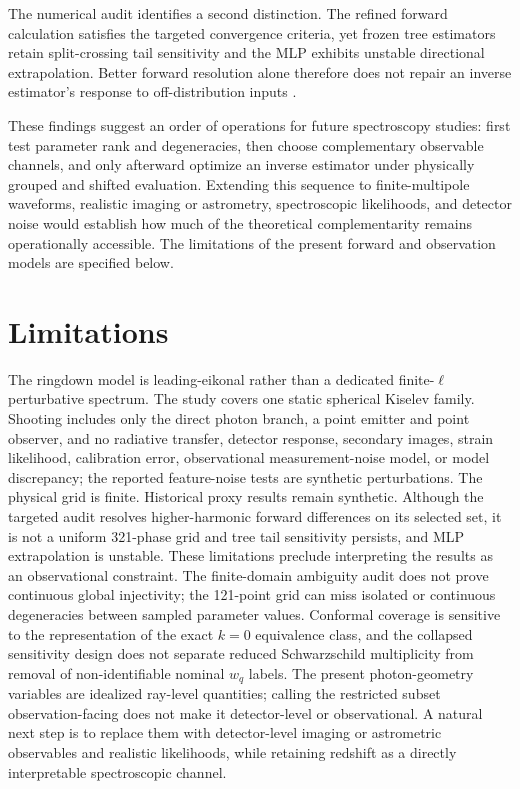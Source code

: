 \documentclass[11pt]{article}
\newcommand{\wq}{w_q}
\begin{document}
The numerical audit identifies a second distinction. The refined forward
calculation satisfies the targeted convergence criteria, yet frozen tree
estimators retain split-crossing tail sensitivity and the MLP exhibits
unstable directional extrapolation. Better forward resolution alone therefore
does not repair an inverse estimator's response to off-distribution inputs
\cite{ovadia2019uncertainty,koh2021wilds,psaros2023uq}.

These findings suggest an order of operations for future spectroscopy
studies: first test parameter rank and degeneracies, then choose complementary
observable channels, and only afterward optimize an inverse estimator under
physically grouped and shifted evaluation. Extending this sequence to
finite-multipole waveforms, realistic imaging or astrometry, spectroscopic
likelihoods, and detector noise would establish how much of the theoretical
complementarity remains operationally accessible. The limitations of the
present forward and observation models are specified below.

\section{Limitations}
The ringdown model is leading-eikonal rather than a dedicated finite-$\ell$
perturbative spectrum. The study covers one static spherical Kiselev family. Shooting includes only the
direct photon branch, a point emitter and point observer, and no radiative
transfer, detector response, secondary images, strain likelihood, calibration
error, observational measurement-noise model, or model discrepancy; the
reported feature-noise tests are synthetic perturbations. The physical grid is finite. Historical proxy
results remain synthetic. Although the targeted audit resolves higher-harmonic
forward differences on its selected set, it is not a uniform 321-phase grid and
tree tail sensitivity persists, and MLP extrapolation is unstable. These
limitations preclude interpreting the results as an observational constraint.
The finite-domain ambiguity audit does not prove continuous global injectivity;
the 121-point grid can miss isolated or continuous degeneracies between sampled
parameter values. Conformal coverage is sensitive to the representation of the
exact $k=0$ equivalence class, and the collapsed sensitivity design does not
separate reduced Schwarzschild multiplicity from removal of non-identifiable
nominal $\wq$ labels.
The present photon-geometry variables are idealized ray-level quantities;
calling the restricted subset observation-facing does not make it
detector-level or observational. A
natural next step is to replace them with detector-level imaging or astrometric
observables and realistic likelihoods, while retaining redshift as a directly
interpretable spectroscopic channel.
\end{document}
